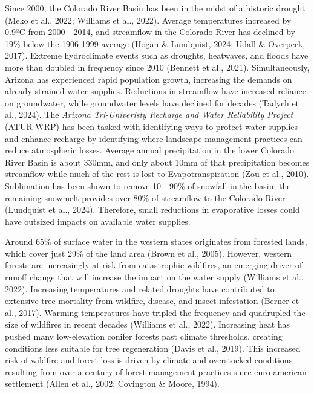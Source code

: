 \documentclass[
]{agujournal2019}
\begin{document}
Since 2000, the Colorado River Basin has been in the midst of a historic
drought (Meko et al., 2022; Williams et al., 2022). Average temperatures
increased by 0.9ºC from 2000 - 2014, and streamflow in the Colorado
River has declined by 19\% below the 1906-1999 average (Hogan \&
Lundquist, 2024; Udall \& Overpeck, 2017). Extreme hydroclimate events
such as droughts, heatwaves, and floods have more than doubled in
frequency since 2010 (Bennett et al., 2021). Simultaneously, Arizona has
experienced rapid population growth, increasing the demands on already
strained water supplies. Reductions in streamflow have increased
reliance on groundwater, while groundwater levels have declined for
decades (Tadych et al., 2024). The \emph{Arizona Tri-Univeristy Recharge
and Water Reliability Project} (ATUR-WRP) has been tasked with
identifying ways to protect water supplies and enhance recharge by
identifying where landscape management practices can reduce atmospheric
losses. Average annual precipitation in the lower Colorado River Basin
is about 330mm, and only about 10mm of that precipitation becomes
streamflow while much of the rest is lost to Evapotranspiration (Zou et
al., 2010). Sublimation has been shown to remove 10 - 90\% of snowfall
in the basin; the remaining snowmelt provides over 80\% of streamflow to
the Colorado River (Lundquist et al., 2024). Therefore, small reductions
in evaporative losses could have outsized impacts on available water
supplies.

Around 65\% of surface water in the western states originates from
forested lands, which cover just 29\% of the land area (Brown et al.,
2005). However, western forests are increasingly at risk from
catastrophic wildfires, an emerging driver of runoff change that will
increase the impact on the water supply (Williams et al., 2022).
Increasing temperatures and related droughts have contributed to
extensive tree mortality from wildfire, disease, and insect infestation
(Berner et al., 2017). Warming temperatures have tripled the frequency
and quadrupled the size of wildfires in recent decades (Williams et al.,
2022). Increasing heat has pushed many low-elevation conifer forests
past climate thresholds, creating conditions less suitable for tree
regeneration (Davis et al., 2019). This increased risk of wildfire and
forest loss is driven by climate and overstocked conditions resulting
from over a century of forest management practices since euro-american
settlement (Allen et al., 2002; Covington \& Moore, 1994).
\end{document}
